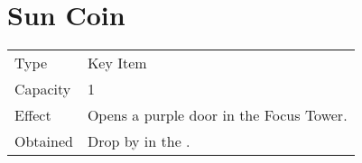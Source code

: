 \section{Sun Coin}
\label{item:sun_coin}


\noindent\begin{tabularx}{\textwidth}[l]{lX}
	Type
	& Key Item
\\ %
	Capacity
	& 1
\\ %
	Effect
	& Opens a purple door in the Focus Tower.
\\ %
	Obtained
	& Drop by \nameref{monster:dualhead_hydra} in the \nameref{map:lava_dome}.
\end{tabularx}
